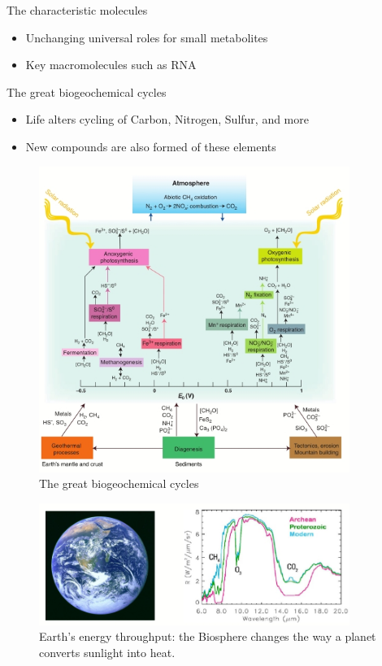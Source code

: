\documentclass[]{article}
\begin{document}
The characteristic molecules
\begin{itemize}
	\item Unchanging universal roles 	for small metabolites
	\item Key macromolecules such as RNA
\end{itemize}

The great biogeochemical cycles
\begin{itemize}
	\item Life alters cycling of Carbon, Nitrogen, Sulfur, and more
	\item New compounds are also formed of 	these elements
\end{itemize}

\begin{figure}[H]
	\caption{The great biogeochemical cycles\cite{falkowski2008microbial}}\label{fig:biogeochemical} 
	\includegraphics[width=0.9\textwidth]{biogeochemical}
\end{figure}



\begin{figure}[H]
	\caption{Earth’s energy throughput: the Biosphere changes the way a planet converts sunlight into heat.\cite{meadows2005modelling}}\label{fig:EnergyThroughput} 
	\includegraphics[width=0.9\textwidth]{EnergyThroughput}
\end{figure}
\end{document}
